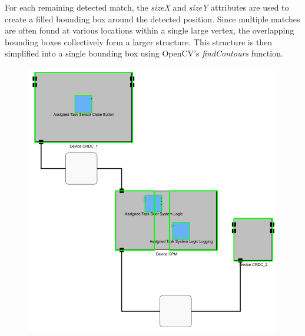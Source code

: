 For each remaining detected match, the \textit{sizeX} and \textit{sizeY} attributes are used to create a filled bounding box around the detected position. Since multiple matches are often found at various locations within a single large vertex, the overlapping bounding boxes collectively form a larger structure. This structure is then simplified into a single bounding box using OpenCV's \textit{findContours} function.
\begin{figure}[htb]
    \centering
    \begin{minipage}[b]{0.36\textwidth}
        \includegraphics[width=\textwidth]{Pictures/many_templates_before.png}
    \end{minipage}
    \hfill
    \begin{minipage}[b]{0.36\textwidth}

\end{minipage}
\end{figure}
